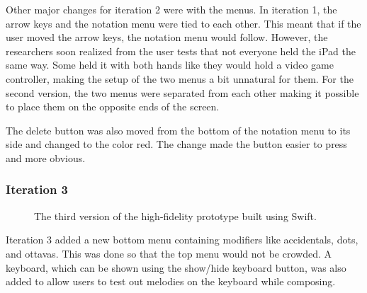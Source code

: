 				Other major changes for iteration 2 were with the menus. In iteration 1, the arrow keys and the notation menu were tied to each other. This meant that if the user moved the arrow keys, the notation menu would follow. However, the researchers soon realized from the user tests that not everyone held the iPad the same way. Some held it with both hands like they would hold a video game controller, making the setup of the two menus a bit unnatural for them. For the second version, the two menus were separated from each other making it possible to place them on the opposite ends of the screen. 

				The delete button was also moved from the bottom of the notation menu to its side and changed to the color red. The change made the button easier to press and more obvious. 

			\subsubsection{Iteration 3}

				\begin{figure}[H]
					\centering
				    \caption{The third version of the high-fidelity prototype built using Swift.}
				    \label{fig:flow_it3}
				\end{figure} 

				Iteration 3 added a new bottom menu containing modifiers like accidentals, dots, and ottavas. This was done so that the top menu would not be crowded. A keyboard, which can be shown using the show/hide keyboard button, was also added to allow users to test out melodies on the keyboard while composing. 


